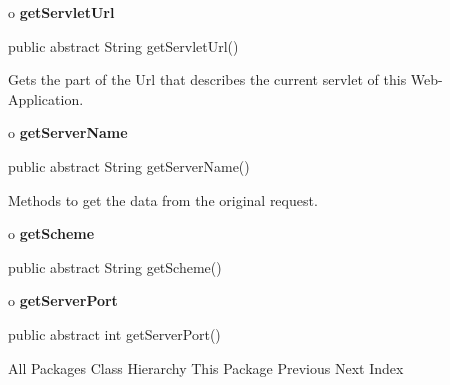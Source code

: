 o {\bf getServletUrl} 

\begin{PRE}
 public abstract String getServletUrl()
\end{PRE}

\begin{description}
\htmlDD Gets the part of the Url that describes the current servlet of this
Web-Application. 

\end{description}

o {\bf getServerName} 

\begin{PRE}
 public abstract String getServerName()
\end{PRE}

\begin{description}
\htmlDD Methods to get the data from the original request. 

\end{description}

o {\bf getScheme} 

\begin{PRE}
 public abstract String getScheme()
\end{PRE}

o {\bf getServerPort} 

\begin{PRE}
 public abstract int getServerPort()
\end{PRE}

\htmlHR

\begin{PRE}
All Packages  Class Hierarchy  This Package  Previous  Next  Index
\end{PRE}

